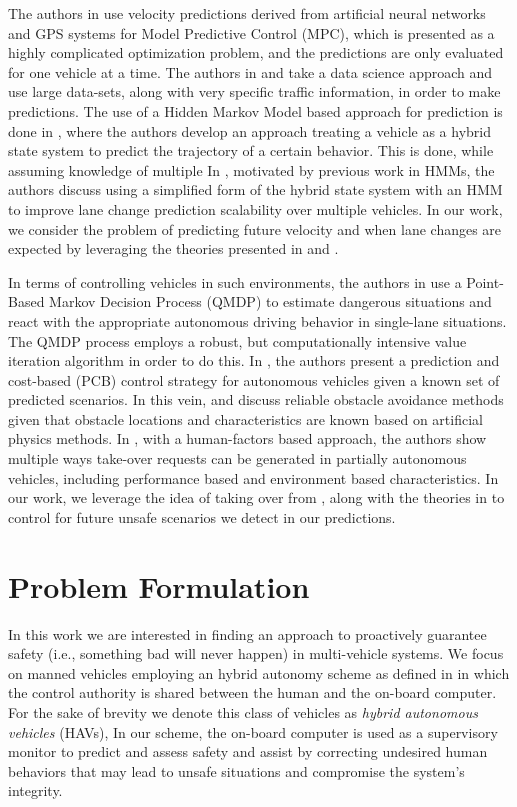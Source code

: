\documentclass[letterpaper, 10 pt, conference]{ieeeconf}  %
\begin{document}
The authors in \cite{mpc} use velocity predictions derived from artificial neural networks and GPS systems for Model Predictive Control (MPC), which is presented as a highly complicated optimization problem, and the predictions are only evaluated for one vehicle at a time. The authors in \cite{velnn} and \cite{veldatadriv} take a data science approach and use large data-sets, along with very specific traffic information, in order to make predictions. The use of a Hidden Markov Model based approach for prediction is done in \cite{lanhmm}, where the authors develop an approach treating a vehicle as a hybrid state system to predict the trajectory of a certain behavior. This is done, while assuming knowledge of multiple In \cite{woohmm}, motivated by previous work in HMMs, the authors discuss using a simplified form of the hybrid state system with an HMM to improve lane change prediction scalability over multiple vehicles. In our work, we consider the problem of predicting future velocity and when lane changes are expected by leveraging the theories presented in \cite{mpc} and \cite{woohmm}. 

In terms of controlling vehicles in such environments, the authors in \cite{qmdp} use a Point-Based Markov Decision Process (QMDP) to estimate dangerous situations and react with the appropriate autonomous driving behavior in single-lane situations. The QMDP process employs a robust, but computationally intensive value iteration algorithm in order to do this. In \cite{predcost}, the authors present a prediction and cost-based (PCB) control strategy for autonomous vehicles given a known set of predicted scenarios. In this vein, \cite{vfh+} and \cite{vfh*} discuss reliable obstacle avoidance methods given that obstacle locations and characteristics are known based on artificial physics methods. In \cite{takeover}, with a human-factors based approach, the authors show multiple ways take-over requests can be generated in partially autonomous vehicles, including performance based and environment based characteristics. In our work, we leverage the idea of taking over from \cite{takeover}, along with the theories in \cite{vfh*} to control for future unsafe scenarios we detect in our predictions.

    
\section{Problem Formulation} \label{sec:probform}
 
In this work we are interested in finding an approach to proactively guarantee safety (i.e., something bad will never happen) in multi-vehicle systems. We focus on manned vehicles employing an hybrid autonomy scheme as defined in \cite{} in which the control authority is shared between the human and the on-board computer. For the sake of brevity we denote this class of vehicles as {\em hybrid autonomous vehicles} (HAVs), In our scheme, the on-board computer is used as a supervisory monitor to predict and assess safety and assist by correcting undesired human behaviors that may lead to unsafe situations and compromise the system's integrity. 
\end{document}
